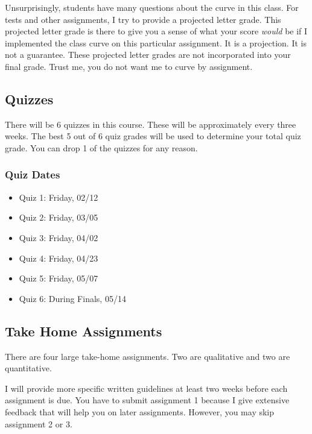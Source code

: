 Unsurprisingly, students have many questions about the curve in this class. For tests and other assignments, I try to provide a projected letter grade.
This projected letter grade is there to give you a sense of what your score \emph{would} be if I implemented the class curve on this particular assignment.
It is a projection. It is not a guarantee. These projected letter grades are not incorporated into your final grade.
Trust me, you do not want me to curve by assignment.

\hypertarget{quizzes-2}{%
\subsection*{Quizzes}\label{quizzes-2}}


There will be 6 quizzes in this course. These will be approximately every three weeks. The best 5 out of 6 quiz grades will be used to determine your total quiz grade. You can drop 1 of the quizzes for any reason.

\hypertarget{quiz-dates-1}{%
\subsubsection*{Quiz Dates}\label{quiz-dates-1}}


\begin{itemize}
\item
  Quiz 1: Friday, 02/12
\item
  Quiz 2: Friday, 03/05
\item
  Quiz 3: Friday, 04/02
\item
  Quiz 4: Friday, 04/23
\item
  Quiz 5: Friday, 05/07
\item
  Quiz 6: During Finals, 05/14
\end{itemize}

\hypertarget{take-home-assignments}{%
\subsection*{Take Home Assignments}\label{take-home-assignments}}


There are four large take-home assignments. Two are qualitative and two are quantitative.

I will provide more specific written guidelines at least two weeks before each assignment is due. You have to submit assignment 1 because I give extensive feedback that will help you on later assignments. However, you may skip assignment 2 or 3.


